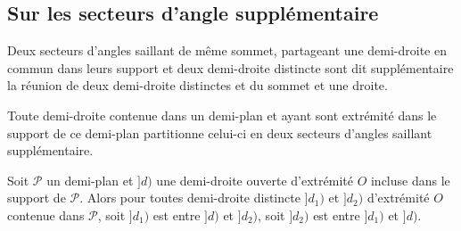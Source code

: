         \subsection{Sur les secteurs d'angle supplémentaire}

\begin{defi}\label{defi-secteurssupplementaire}
Deux secteurs d'angles saillant de même sommet, partageant une demi-droite en commun dans leurs support et deux demi-droite distincte sont dit supplémentaire \ssi la réunion de deux demi-droite distinctes et du sommet et une droite.
\end{defi}
\begin{prop}\label{prop-partitiondemiplan}
    Toute demi-droite contenue dans un demi-plan et ayant sont extrémité dans le support de ce demi-plan partitionne celui-ci en deux secteurs d'angles saillant supplémentaire.
\end{prop}
\begin{cor}\label{cor-B3demidroite}
    Soit $\mathcal{P}$ un demi-plan et $]d)$ une demi-droite ouverte d'extrémité $O$ incluse dans le support de $\mathcal{P}$. Alors pour toutes demi-droite distincte $]d_1)$ et $]d_2)$ d'extrémité $O$ contenue dans $\mathcal{P}$, soit $]d_1)$ est entre $]d)$ et $]d_2)$, soit $]d_2)$ est entre $]d_1)$ et $]d)$.
\end{cor}
